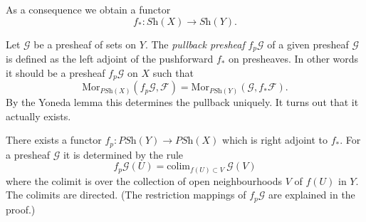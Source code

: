 \noindent
As a consequence we obtain a functor
$$
f_* : \textit{Sh}(X) \longrightarrow \textit{Sh}(Y).
$$

\noindent
Let $\mathcal{G}$ be a presheaf of sets on $Y$.
The {\it pullback presheaf} $f_p\mathcal{G}$
of a given presheaf $\mathcal{G}$ is defined as the left adjoint
of the pushforward $f_*$ on presheaves. In other words it
should be a presheaf $f_p \mathcal{G}$ on $X$ such that
$$
\text{Mor}_{\textit{PSh}(X)}(f_p\mathcal{G}, \mathcal{F})
=
\text{Mor}_{\textit{PSh}(Y)}(\mathcal{G}, f_*\mathcal{F}).
$$
By the Yoneda lemma this determines the pullback uniquely.
It turns out that it actually exists.

\begin{lemma}
\label{lemma-pullback-presheaves}
There exists a functor
$f_p : \textit{PSh}(Y) \to \textit{PSh}(X)$
which is right adjoint to $f_*$. For a presheaf
$\mathcal{G}$ it is determined by the rule
$$
f_p\mathcal{G}(U) = \text{colim}_{f(U) \subset V}\ \mathcal{G}(V)
$$
where the colimit is over the collection of open neighbourhoods
$V$ of $f(U)$ in $Y$. The colimits are directed. (The restriction
mappings of $f_p\mathcal{G}$ are explained in the proof.)
\end{lemma}

